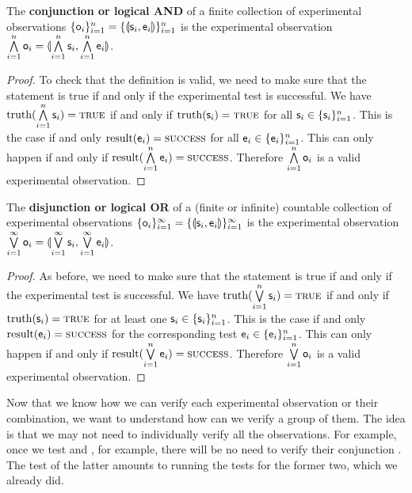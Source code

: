 \documentclass[11pt,letterpaper,fleqn]{memoir} %
\begin{document}
\begin{mathSection}
	\begin{defn}
	The \textbf{conjunction or logical AND} of a finite collection  of experimental observations $\{\mathsf{o}_i\}_{i=1}^{n}=\{\llparenthesis \mathsf{s}_i, \mathsf{e}_i\rrparenthesis\}_{i=1}^{n}$ is the experimental observation $\bigwedge\limits_{i=1}^{n} \mathsf{o}_i = \llparenthesis \bigwedge\limits_{i=1}^{n} \mathsf{s}_i, \bigwedge\limits_{i=1}^{n} \mathsf{e}_i\rrparenthesis$.
\end{defn}
\begin{proof}
	To check that the definition is valid, we need to make sure that the statement is true if and only if the experimental test is successful. We have $\operatorname{truth}(\bigwedge\limits_{i=1}^{n} \mathsf{s}_i) = \textsc{true}$ if and only if $\operatorname{truth}(\mathsf{s}_i) = \textsc{true}$ for all $\mathsf{s}_i \in \{\mathsf{s}_i\}_{i=1}^{n}$. This is the case if and only $\operatorname{result}(\mathsf{e}_i) = \textsc{success}$ for all $\mathsf{e}_i \in \{\mathsf{e}_i\}_{i=1}^{n}$. This can only happen if and only if   $\operatorname{result}(\bigwedge\limits_{i=1}^{n} \mathsf{e}_i) = \textsc{success}$. Therefore $\bigwedge\limits_{i=1}^{n} \mathsf{o}_i$ is a valid experimental observation.
\end{proof}
	\begin{defn}
	The \textbf{disjunction or logical OR} of a (finite or infinite) countable  collection of experimental observations $\{\mathsf{o}_i\}_{i=1}^{\infty}=\{\llparenthesis \mathsf{s}_i, \mathsf{e}_i\rrparenthesis\}_{i=1}^{\infty}$ is the experimental observation $\bigvee\limits_{i=1}^{\infty} \mathsf{o}_i = \llparenthesis \bigvee\limits_{i=1}^{\infty} \mathsf{s}_i, \bigvee\limits_{i=1}^{\infty} \mathsf{e}_i\rrparenthesis$.
\end{defn}
\begin{proof}
	As before, we need to make sure that the statement is true if and only if the experimental test is successful. We have $\operatorname{truth}(\bigvee\limits_{i=1}^{n} \mathsf{s}_i) = \textsc{true}$ if and only if $\operatorname{truth}(\mathsf{s}_i) = \textsc{true}$ for at least one $\mathsf{s}_i \in \{\mathsf{s}_i\}_{i=1}^{n}$. This is the case if and only $\operatorname{result}(\mathsf{e}_i) = \textsc{success}$ for the corresponding test $\mathsf{e}_i \in \{\mathsf{e}_i\}_{i=1}^{n}$. This can only happen if and only if   $\operatorname{result}(\bigvee\limits_{i=1}^{n} \mathsf{e}_i) = \textsc{success}$. Therefore $\bigvee\limits_{i=1}^{n} \mathsf{o}_i$ is a valid experimental observation.
\end{proof}
\end{mathSection}

Now that we know how we can verify each experimental observation or their combination, we want to understand how can we verify a group of them. The idea is that we may not need to individually verify all the observations. For example, once we test  and , for example, there will be no need to verify their conjunction . The test of the latter amounts to running the tests for the former two, which we already did.
\end{document}
